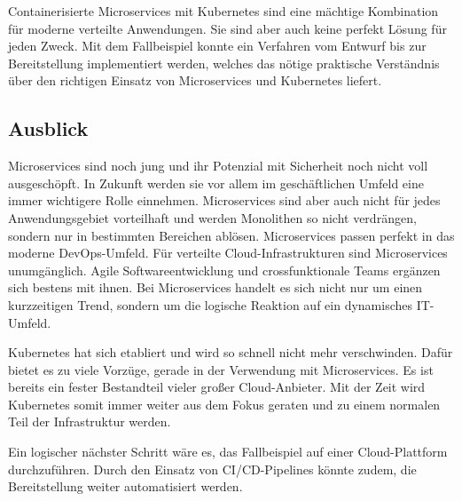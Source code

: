 Containerisierte Microservices mit Kubernetes sind eine mächtige Kombination für moderne verteilte Anwendungen. Sie sind aber auch keine perfekt Lösung für jeden Zweck. Mit dem Fallbeispiel konnte ein Verfahren vom Entwurf bis zur Bereitstellung implementiert werden, welches das nötige praktische Verständnis über den richtigen Einsatz von Microservices und Kubernetes liefert.

\subsection{Ausblick}

Microservices sind noch jung und ihr Potenzial mit Sicherheit noch nicht voll ausgeschöpft. In Zukunft werden sie vor allem im geschäftlichen Umfeld eine immer wichtigere Rolle einnehmen. Microservices sind aber auch nicht für jedes Anwendungsgebiet vorteilhaft und werden Monolithen so nicht verdrängen, sondern nur in bestimmten Bereichen ablösen. Microservices passen perfekt in das moderne DevOps-Umfeld. Für verteilte Cloud-Infrastrukturen sind Microservices unumgänglich. Agile Softwareentwicklung und crossfunktionale Teams ergänzen sich bestens mit ihnen. Bei Microservices handelt es sich nicht nur um einen kurzzeitigen Trend, sondern um die logische Reaktion auf ein dynamisches IT-Umfeld.

Kubernetes hat sich etabliert und wird so schnell nicht mehr verschwinden. Dafür bietet es zu viele Vorzüge, gerade in der Verwendung mit Microservices. Es ist bereits ein fester Bestandteil vieler großer Cloud-Anbieter. Mit der Zeit wird Kubernetes somit immer weiter aus dem Fokus geraten und zu einem normalen Teil der Infrastruktur werden.

Ein logischer nächster Schritt wäre es, das Fallbeispiel auf einer Cloud-Plattform durchzuführen. Durch den Einsatz von CI/CD-Pipelines könnte zudem, die Bereitstellung weiter automatisiert werden.
